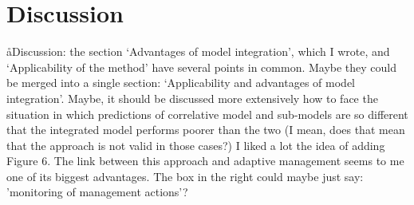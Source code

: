 \section*{Discussion}
\aa{Discussion: the section ‘Advantages of model integration’, which I wrote, and ‘Applicability of the method’ have several points in common. Maybe they could be merged into a single section: ‘Applicability and advantages of model integration’. Maybe, it should be discussed more extensively how to face the situation in which predictions of correlative model and sub-models are so different that the integrated model performs poorer than the two (I mean, does that mean that the approach is not valid in those cases?)
I liked a lot the idea of adding Figure 6. The link between this approach and adaptive management seems to me one of its biggest advantages. The box in the right could maybe just say: 'monitoring of management actions’? }

